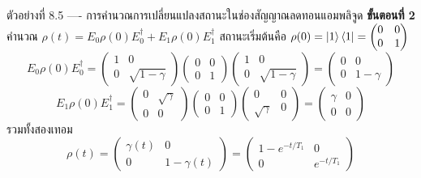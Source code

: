 \begin{psctbox}{ตัวอย่างที่ 8.5 ---- การคำนวณการเปลี่ยนแปลงสถานะในช่องสัญญาณลดทอนแอมพลิจูด}
\textbf{ขั้นตอนที่ 2} คำนวณ $\rho(t) = E_0 \rho(0) E_0^\dagger + E_1 \rho(0) E_1^\dagger$
สถานะเริ่มต้นคือ $\rho(0) = \ket{1}\bra{1} = \begin{pmatrix} 0 & 0 \\ 0 & 1 \end{pmatrix}$
\begin{equation*}
E_0 \rho(0) E_0^\dagger = \begin{pmatrix} 1 & 0 \\ 0 & \sqrt{1 - \gamma} \end{pmatrix} \begin{pmatrix} 0 & 0 \\ 0 & 1 \end{pmatrix} \begin{pmatrix} 1 & 0 \\ 0 & \sqrt{1 - \gamma} \end{pmatrix} = \begin{pmatrix} 0 & 0 \\ 0 & 1 - \gamma \end{pmatrix}
\end{equation*}
\begin{equation*}
E_1 \rho(0) E_1^\dagger = \begin{pmatrix} 0 & \sqrt{\gamma} \\ 0 & 0 \end{pmatrix} \begin{pmatrix} 0 & 0 \\ 0 & 1 \end{pmatrix} \begin{pmatrix} 0 & 0 \\ \sqrt{\gamma} & 0 \end{pmatrix} = \begin{pmatrix} \gamma & 0 \\ 0 & 0 \end{pmatrix}
\end{equation*}
รวมทั้งสองเทอม
\begin{equation*}
\rho(t) = \begin{pmatrix} \gamma(t) & 0 \\ 0 & 1 - \gamma(t) \end{pmatrix} = \begin{pmatrix} 1 - e^{-t/T_1} & 0 \\ 0 & e^{-t/T_1} \end{pmatrix}
\end{equation*}


\end{psctbox}
